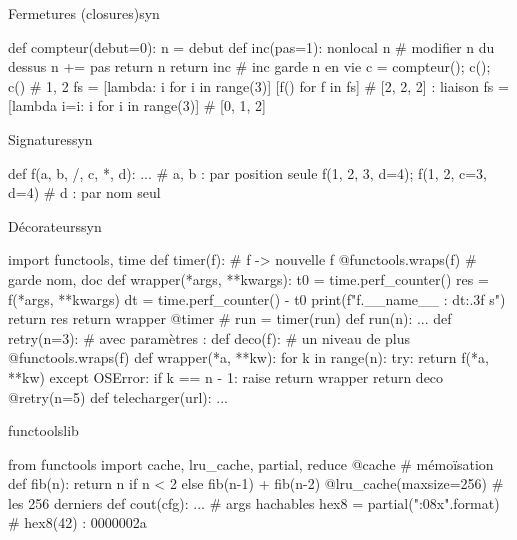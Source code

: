\documentclass{article}
\begin{document}
\begin{colonne}[fonctions][col-b]
\begin{bloc}{Fermetures (closures)}{syn}
\begin{code}
def compteur(debut=0):
    n = debut
    def inc(pas=1):
        nonlocal n        # modifier n du dessus
        n += pas
        return n
    return inc            # inc garde n en vie
c = compteur(); c(); c()  # 1, 2
fs = [lambda: i for i in range(3)]
[f() for f in fs]         # [2, 2, 2] : liaison
fs = [lambda i=i: i for i in range(3)]  # [0, 1, 2]
\end{code}
\end{bloc}

\begin{bloc}{Signatures}{syn}
\begin{code}
def f(a, b, /, c, *, d): ...  # a, b : par position seule
f(1, 2, 3, d=4); f(1, 2, c=3, d=4)  # d : par nom seul
\end{code}
\end{bloc}

\begin{bloc}{Décorateurs}{syn}
\begin{code}
import functools, time
def timer(f):            # f -> nouvelle f
    @functools.wraps(f)  # garde nom, doc
    def wrapper(*args, **kwargs):
        t0 = time.perf_counter()
        res = f(*args, **kwargs)
        dt = time.perf_counter() - t0
        print(f"{f.__name__} : {dt:.3f} s")
        return res
    return wrapper
@timer                   # run = timer(run)
def run(n): ...
def retry(n=3):          # avec paramètres :
    def deco(f):         # un niveau de plus
        @functools.wraps(f)
        def wrapper(*a, **kw):
            for k in range(n):
                try: return f(*a, **kw)
                except OSError:
                    if k == n - 1: raise
        return wrapper
    return deco
@retry(n=5)
def telecharger(url): ...
\end{code}
\end{bloc}

\begin{bloc}{functools}{lib}
\begin{code}
from functools import cache, lru_cache, partial, reduce
@cache                           # mémoïsation
def fib(n): return n if n < 2 else fib(n-1) + fib(n-2)
@lru_cache(maxsize=256)          # les 256 derniers
def cout(cfg): ...               # args hachables
hex8 = partial("{:08x}".format)  # hex8(42) : 0000002a
\end{code}
\end{bloc}
\end{colonne}\colbreak
\end{document}

